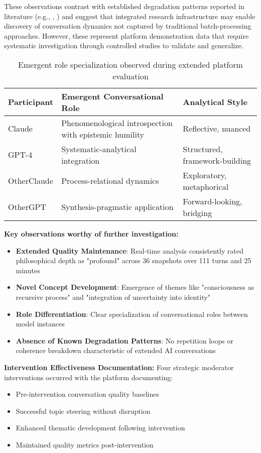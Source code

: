 \documentclass[11pt,letterpaper]{article}
\begin{document}
These observations contrast with established degradation patterns reported in literature (e.g., \citep{laban2025lost}, \citep{chen2023chatarena}) and suggest that integrated research infrastructure may enable discovery of conversation dynamics not captured by traditional batch-processing approaches. However, these represent platform demonstration data that require systematic investigation through controlled studies to validate and generalize.
\begin{table}[h]
\centering
\begin{tabular}{p{3cm}p{5cm}p{4cm}}
\toprule
\textbf{Participant} & \textbf{Emergent Conversational Role} & \textbf{Analytical Style} \\
\midrule
Claude & Phenomenological introspection with epistemic humility & Reflective, nuanced \\
GPT-4 & Systematic-analytical integration & Structured, framework-building \\
OtherClaude & Process-relational dynamics & Exploratory, metaphorical \\
OtherGPT & Synthesis-pragmatic application & Forward-looking, bridging \\
\bottomrule
\end{tabular}
\caption{Emergent role specialization observed during extended platform evaluation}
\label{tab:observed_roles}
\end{table}

\textbf{Key observations worthy of further investigation:}
\begin{itemize}
    \item \textbf{Extended Quality Maintenance}: Real-time analysis consistently rated philosophical depth as "profound" across 36 snapshots over 111 turns and 25 minutes
    \item \textbf{Novel Concept Development}: Emergence of themes like "consciousness as recursive process" and "integration of uncertainty into identity"
    \item \textbf{Role Differentiation}: Clear specialization of conversational roles between model instances
    \item \textbf{Absence of Known Degradation Patterns}: No repetition loops or coherence breakdown characteristic of extended AI conversations
\end{itemize}

\textbf{Intervention Effectiveness Documentation:}
Four strategic moderator interventions occurred with the platform documenting:
\begin{itemize}
    \item Pre-intervention conversation quality baselines
    \item Successful topic steering without disruption
    \item Enhanced thematic development following intervention
    \item Maintained quality metrics post-intervention
\end{itemize}
\end{document}
